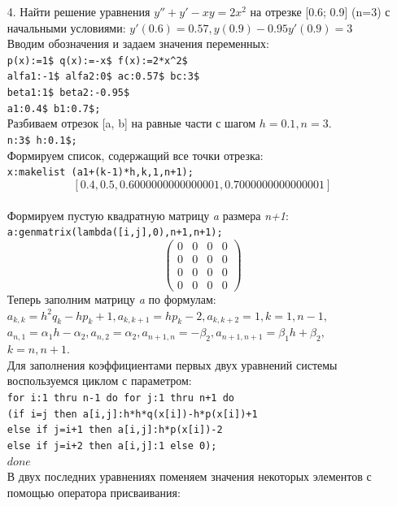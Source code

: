 \documentclass[article, bachelor, och, pract]{SCWorks}
\begin{document}
\begin{itemize}
\item[4.] Найти решение уравнения $y''+y'-xy=2x^2$ на отрезке [0.6; 0.9] (n=3) с начальными условиями: $y'(0.6)=0.57, y(0.9)-0.95y'(0.9)=3$\\
Вводим обозначения и задаем значения переменных:\\
\texttt{p(x):=1\$ q(x):=-x\$ f(x):=2*x\^{}2\$ \\
alfa1:-1\$ alfa2:0\$ ac:0.57\$ bc:3\$\\
beta1:1\$ beta2:-0.95\$\\
a1:0.4\$ b1:0.7\$;}\\
Разбиваем отрезок [a, b] на равные части с шагом $h=0.1, n=3$.\\
\texttt{n:3\$ h:0.1\$;}\\
Формируем список, содержащий все точки отрезка:\\
\texttt{x:makelist (a1+(k-1)*h,k,1,n+1);}\\
\[[0.4,0.5,0.6000000000000001,0.7000000000000001]\]\\
Формируем пустую квадратную матрицу \emph{a} размера \emph{n+1}:\\
\texttt{a:genmatrix(lambda([i,j],0),n+1,n+1);}\\
$$\begin{pmatrix}
0 & 0 & 0 & 0\\
0 & 0 & 0 & 0\\
0 & 0 & 0 & 0\\
0 & 0 & 0 & 0
\end{pmatrix}$$
Теперь заполним матрицу \emph{a} по формулам:\\
\(a_{k,k}=h^2q_{k}-hp_{k}+1,
a_{k,k+1}=hp_{k}-2,
a_{k,k+2}=1, k=1, n-1,\) \\
\(a_{n,1}=\alpha_{1}h-\alpha_{2},
a_{n,2}=\alpha_{2}, a_{n+1,n}=-\beta_{2},
a_{n+1,n+1}=\beta_{1}h+\beta_{2},\) \\
\(k=n,n+1.\)\\
Для заполнения коэффициентами первых двух уравнений системы воспользуемся циклом с параметром:\\
\texttt{for i:1 thru n-1 do for j:1 thru n+1 do\\
(if i=j then a[i,j]:h*h*q(x[i])-h*p(x[i])+1\\
else if j=i+1 then a[i,j]:h*p(x[i])-2\\
else if j=i+2 then a[i,j]:1 else 0);}\\
\(\mathit{done}\mbox{}\)\\
В двух последних уравнениях поменяем значения некоторых элементов с помощью оператора присваивания:\\

\end{itemize}
\end{document}
